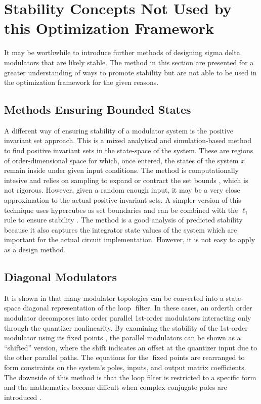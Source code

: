\section{Stability Concepts Not Used by this Optimization Framework}
\label{sec:stab-notused}

It may be worthwhile to introduce further methods of designing sigma delta modulators that are likely stable. The method in this section are presented for a greater understanding of ways to promote stability but are not able to be used in the optimization framework for the given reasons.

\subsection{Methods Ensuring Bounded States}

A different way of ensuring stability of a modulator system is the positive invariant set approach. This is a mixed analytical and simulation-based method to find positive invariant sets in the state-space of the system. These are regions of \gls{order}-dimensional space for which, once entered, the states of the system $x$ remain inside under given input conditions. The method is computationally intesive and relies on sampling to expand or contract the set bounds \cite{Schreier1997}, which is not rigorous. However, given a random enough input, it may be a very close approximation to the actual positive invariant sets. A simpler version of this technique uses hypercubes as set boundaries and can be combined with the $\ell_1$ rule to ensure stability \cite{Yagyu2004a}. The method is a good analysis of predicted stability because it also captures the integrator state values of the system which are important for the actual circuit implementation. However, it is not easy to apply as a design method.

\subsection{Diagonal Modulators}

It is shown in \cite{Steiner1997} that many modulator topologies can be converted into a state-space diagonal representation of the loop filter. In these cases, an \gls{order}th order modulator decomposes into \gls{order} parallel 1st-order modulators interacting only through the quantizer nonlinearity. By examining the stability of the 1st-order modulator using its fixed points \cite{Steiner1996}, the parallel modulators can be shown as a ``shifted'' version, where the shift indicates an offset at the quantizer input due to the other parallel paths. The equations for the fixed points are rearranged to form constraints on the system's poles, inputs, and output matrix coefficients. The downside of this method is that the loop filter is restricted to a specific form and the mathematics become diffcult when complex conjugate poles are introduced \cite{Mladenov2013}.

